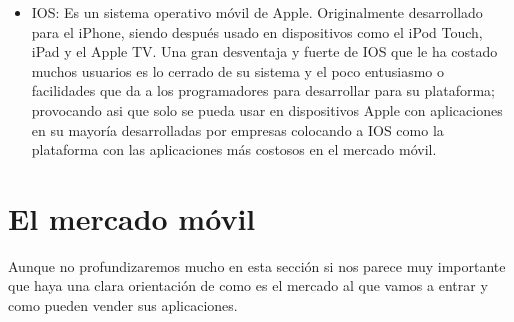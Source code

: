 \documentclass[11pt]{book}
\begin{document}
\begin{itemize}
\item IOS: Es un sistema operativo móvil de Apple. Originalmente desarrollado para el iPhone, siendo después usado en dispositivos como el iPod Touch, iPad y el Apple TV. Una gran desventaja y fuerte de IOS que le ha costado muchos usuarios es lo cerrado de su sistema y el poco entusiasmo o facilidades que da a los programadores para desarrollar para su plataforma; provocando asi que solo se pueda usar en dispositivos Apple con aplicaciones en su mayoría desarrolladas por empresas colocando a IOS como la plataforma con las aplicaciones más costosos en el mercado móvil.

\end{itemize}

\newpage
\section{El mercado móvil} 
Aunque no profundizaremos mucho en esta sección si nos parece muy importante que haya una clara orientación de como es el mercado al que vamos a entrar y como pueden vender sus aplicaciones.
\end{document}
